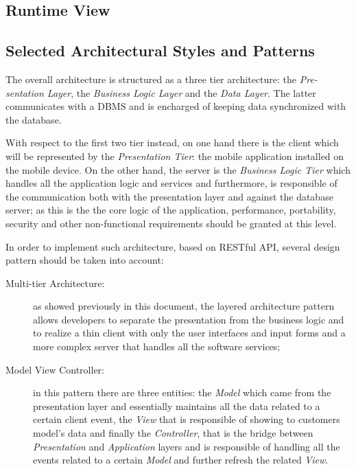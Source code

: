 \documentclass[a4paper]{article}
\begin{document}
\newpage
\subsection{Runtime View}

\newpage
\subsection{Selected Architectural Styles and Patterns}
    The overall architecture is structured as a three tier architecture: the \textit{Pre-\newline sentation Layer}, the \textit{Business Logic Layer} and the \textit{Data Layer}. The latter communicates with a DBMS and is encharged of keeping data synchronized with the database.
    
    With respect to the first two tier instead, on one hand there is the client which will be represented by the \textit{Presentation Tier}: the mobile application installed on the mobile device. On the other hand, the server is the \textit{Business Logic Tier} which handles all the application logic and services and furthermore, is responsible of the communication both with the presentation layer and against the database server; as this is the the core logic of the application, performance, portability, security and other non-functional requirements should be granted at this level.
    
    In order to implement such architecture, based on RESTful API, several design pattern should be taken into account:
    \begin{description}
        \item[Multi-tier Architecture:] as showed previously in this document, the layered architecture pattern allows developers to separate the presentation from the business logic and to realize a thin client with only the user interfaces and input forms and a more complex server that handles all the software services;
        \item[Model View Controller:] in this pattern there are three entities: the \textit{Model} which came from the presentation layer and essentially maintains all the data related to a certain client event, the \textit{View} that is responsible of showing to customers model's data and finally the \textit{Controller}, that is the bridge between \textit{Presentation} and \textit{Application} layers and is responsible of handling all the events related to a certain \textit{Model} and further refresh the related \textit{View}.
    \end{description}
\end{document}
